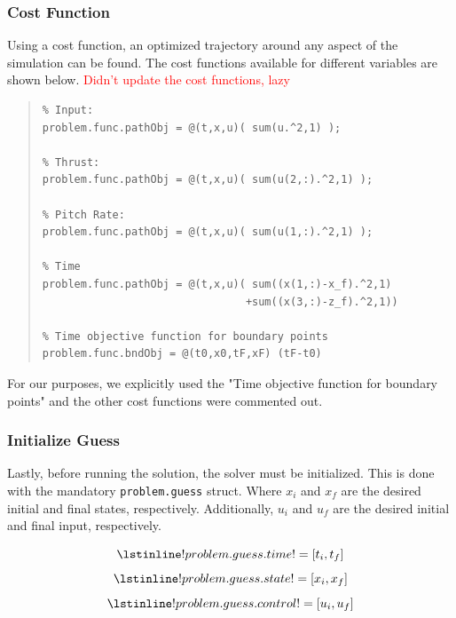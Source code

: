 \documentclass[12pt]{article}
\begin{document}
\subsubsection{Cost Function}
Using a cost function, an optimized trajectory around any aspect of the simulation can be found. The cost functions available for different variables are shown below. 
\textcolor{red}{Didn't update the cost functions, lazy}
\begin{quote}
\begin{lstlisting}
% Input:
problem.func.pathObj = @(t,x,u)( sum(u.^2,1) );

% Thrust:
problem.func.pathObj = @(t,x,u)( sum(u(2,:).^2,1) );

% Pitch Rate:
problem.func.pathObj = @(t,x,u)( sum(u(1,:).^2,1) );

% Time
problem.func.pathObj = @(t,x,u)( sum((x(1,:)-x_f).^2,1) 
                                +sum((x(3,:)-z_f).^2,1))

% Time objective function for boundary points
problem.func.bndObj = @(t0,x0,tF,xF) (tF-t0)

\end{lstlisting}
\end{quote}
For our purposes, we explicitly used the "Time objective function for boundary points" and the other cost functions were commented out.

\clearpage

\subsubsection{Initialize Guess}
Lastly, before running the solution, the solver must be initialized. This is done with the mandatory \lstinline!problem.guess! struct. Where $x_{i}$ and $x_{f}$ are the desired initial and final states, respectively. Additionally, $u_{i}$ and $u_{f}$ are the desired initial and final input, respectively. 

\begin{figure}[H]
\begin{equation*}
\lstinline!problem.guess.time! = [t_{i}, t_{f}]
\end{equation*}
\begin{equation*}
\lstinline!problem.guess.state! = [x_{i}, x_{f}]
\end{equation*}
\begin{equation*}
\lstinline!problem.guess.control! = [u_{i}, u_{f}] 
\end{equation*}
\end{figure}
\end{document}
